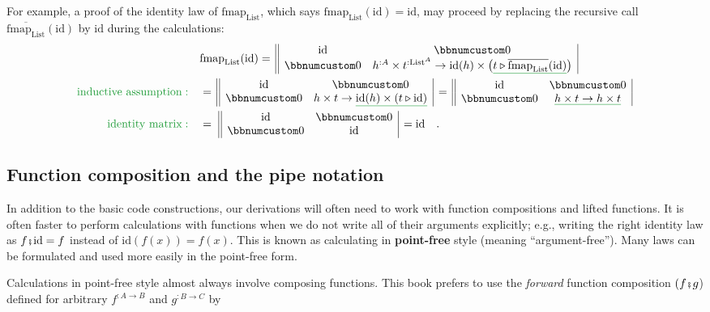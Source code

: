 For example, a proof of the identity law of $\text{fmap}_{\text{List}}$,
which says $\text{fmap}_{\text{List}}(\text{id})=\text{id}$, may
proceed by replacing the recursive call $\overline{\text{fmap}_{\text{List}}}(\text{id})$
by $\text{id}$ during the calculations:
\begin{align*}
 & \text{fmap}_{\text{List}}(\text{id})=\,\begin{array}{||cc|}
\text{id} & \bbnum 0\\
\bbnum 0 & h^{:A}\times t^{:\text{List}^{A}}\rightarrow\text{id}(h)\times\big(\gunderline{t\triangleright\overline{\text{fmap}_{\text{List}}}(\text{id})}\big)
\end{array}\\
{\color{greenunder}\text{inductive assumption}:}\quad & =\,\begin{array}{||cc|}
\text{id} & \bbnum 0\\
\bbnum 0 & h\times t\rightarrow\gunderline{\text{id}(h)\times(t\triangleright\text{id})}
\end{array}\,=\,\begin{array}{||cc|}
\text{id} & \bbnum 0\\
\bbnum 0 & \gunderline{h\times t\rightarrow h\times t}
\end{array}\\
{\color{greenunder}\text{identity matrix}:}\quad & =\,\,\begin{array}{||cc|}
\text{id} & \bbnum 0\\
\bbnum 0 & \text{id}
\end{array}\,=\text{id}\quad.
\end{align*}


\subsection{Function composition and the pipe notation}

In addition to the basic code constructions, our derivations will
often need to work with function compositions and lifted functions.
It is often faster to perform calculations with functions when we
do not write all of their arguments explicitly; e.g., writing the
right identity law as $f\bef\text{id}=f$ instead of $\text{id}\left(f(x)\right)=f(x)$.
This is known as calculating in \textbf{point-free}
style (meaning \textsf{``}argument-free\textsf{''}). Many laws can be formulated and
used more easily in the point-free form. 

Calculations in point-free style almost always involve composing functions.
This book prefers to use the \emph{forward} function composition $(f\bef g$)
defined for arbitrary $f^{:A\rightarrow B}$ and $g^{:B\rightarrow C}$
by

